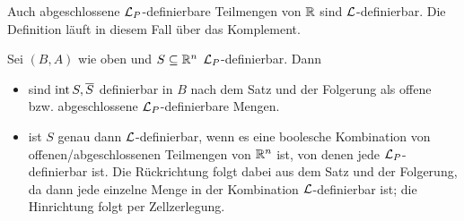 \begin{corollary}
	Auch abgeschlossene $\mathcal{L}_P$-definierbare Teilmengen von $\mathbb{R}$ sind $\mathcal{L}$-definierbar. Die Definition läuft in diesem Fall über das Komplement.
\end{corollary}
\begin{corollary}
	Sei $(B,A)$ wie oben und $S\subseteq\mathbb{R}^n$ $\mathcal{L}_P$-definierbar. Dann
	\begin{itemize}
		\item sind $\operatorname{int} S,\overline{S}$ definierbar in $B$ nach dem Satz und der Folgerung als offene bzw. abgeschlossene $\mathcal{L}_P$-definierbare Mengen.
		\item ist $S$ genau dann $\mathcal{L}$-definierbar, wenn es eine boolesche Kombination von offenen/abgeschlossenen Teilmengen von $\mathbb{R}^n$ ist, von denen jede $\mathcal{L}_P$-definierbar ist. Die Rückrichtung folgt dabei aus dem Satz und der Folgerung, da dann jede einzelne Menge in der Kombination $\mathcal{L}$-definierbar ist; die Hinrichtung folgt per Zellzerlegung.
	\end{itemize}
\end{corollary}

